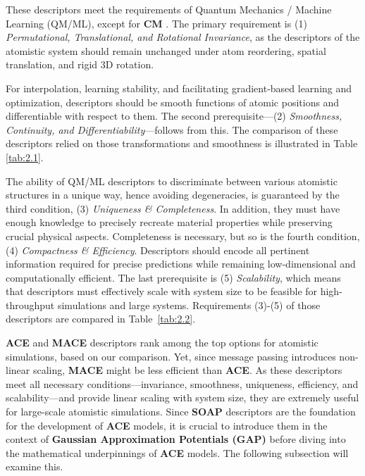 \newpage
These descriptors meet the requirements of Quantum Mechanics / Machine Learning (QM/ML), except for \textbf{CM} \cite{Musil2021, Langer2022}.
The primary requirement is (1) \textit{Permutational, Translational, and Rotational Invariance}, as the descriptors of the atomistic system should remain unchanged under atom reordering, spatial translation, and rigid 3D rotation.

For interpolation, learning stability, and facilitating gradient-based learning and optimization, descriptors should be smooth functions of atomic positions and differentiable with respect to them. 
The second prerequisite—(2) \textit{Smoothness, Continuity, and Differentiability}—follows from this.
The comparison of these descriptors relied on those transformations and smoothness is illustrated in Table \ref{tab:2.1}.

The ability of QM/ML descriptors to discriminate between various atomistic structures in a unique way, hence avoiding degeneracies, is guaranteed by the third condition, (3) \textit{Uniqueness \& Completeness}.
In addition, they must have enough knowledge to precisely recreate material properties while preserving crucial physical aspects.
Completeness is necessary, but so is the fourth condition, (4) \textit{Compactness \& Efficiency}. Descriptors should encode all pertinent information required for precise predictions while remaining low-dimensional and computationally efficient.
The last prerequisite is (5) \textit{Scalability}, which means that descriptors must effectively scale with system size to be feasible for high-throughput simulations and large systems.%
Requirements (3)-(5) of those descriptors are compared in Table~\ref{tab:2.2}.

\textbf{ACE} and \textbf{MACE} descriptors rank among the top options for atomistic simulations, based on our comparison.
Yet, since message passing introduces non-linear scaling, \textbf{MACE} might be less efficient than \textbf{ACE}.
As these descriptors meet all necessary conditions—invariance, smoothness, uniqueness, efficiency, and scalability—and provide linear scaling with system size, they are extremely useful for large-scale atomistic simulations.
Since \textbf{SOAP} descriptors are the foundation for the development of \textbf{ACE} models, it is crucial to introduce them in the context of \textbf{Gaussian Approximation Potentials (GAP)} before diving into the mathematical underpinnings of \textbf{ACE} models.
The following subsection will examine this.


